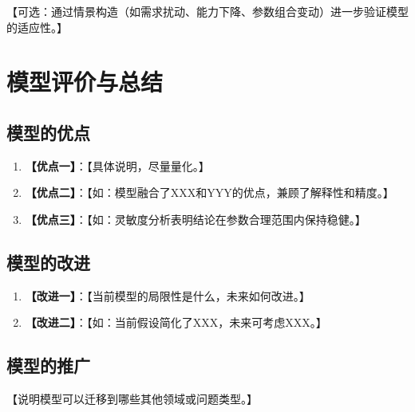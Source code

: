 \documentclass[withoutpreface,bwprint]{cumcmthesis}
\begin{document}
【可选：通过情景构造（如需求扰动、能力下降、参数组合变动）进一步验证模型的适应性。】

\section{模型评价与总结}

\subsection{模型的优点}

\begin{enumerate}
    \item \textbf{【优点一】}：【具体说明，尽量量化。】
    \item \textbf{【优点二】}：【如：模型融合了XXX和YYY的优点，兼顾了解释性和精度。】
    \item \textbf{【优点三】}：【如：灵敏度分析表明结论在参数合理范围内保持稳健。】
\end{enumerate}

\subsection{模型的改进}

\begin{enumerate}
    \item \textbf{【改进一】}：【当前模型的局限性是什么，未来如何改进。】
    \item \textbf{【改进二】}：【如：当前假设简化了XXX，未来可考虑XXX。】
\end{enumerate}

\subsection{模型的推广}

【说明模型可以迁移到哪些其他领域或问题类型。】
\end{document}
